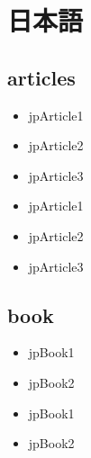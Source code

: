 \documentclass[10pt, a4paper]{jsarticle}
\newcommand{\putlst}[1]{
  \noindent\makebox[\linewidth]{\rule{\linewidth}{0.4pt}}\vspace{-1.5zw}
  \vspace{-1.8zw}
  \noindent\makebox[\linewidth]{\rule{\linewidth}{0.4pt}}\vspace{0.5zw}\par
}
\begin{document}
\section{日本語}

\subsection{articles}

\putlst{bib/jparticle.bib}

\begin{bibunit}[IEEJtran]
  \begin{itemize}
    \item jpArticle1 \cite{jpArticle1}
    \item jpArticle2 \cite{jpArticle2}
    \item jpArticle3 \cite{jpArticle3}
  \end{itemize}
  {\small {}}
\end{bibunit}
\begin{bibunit}[jIEEEtran]
  \begin{itemize}
    \item jpArticle1 \cite{jpArticle1}
    \item jpArticle2 \cite{jpArticle2}
    \item jpArticle3 \cite{jpArticle3}
  \end{itemize}
  {\small {}}
\end{bibunit}



\subsection{book}

\putlst{bib/jpbook.bib}

\begin{bibunit}[IEEJtran]
  \begin{itemize}
    \item jpBook1 \cite{jpBook1}
    \item jpBook2 \cite{jpBook2}
  \end{itemize}
  {\small {}}
\end{bibunit}
\begin{bibunit}[jIEEEtran]
  \begin{itemize}
    \item jpBook1 \cite{jpBook1}
    \item jpBook2 \cite{jpBook2}
  \end{itemize}
  {\small {}}
\end{bibunit}
\end{document}
